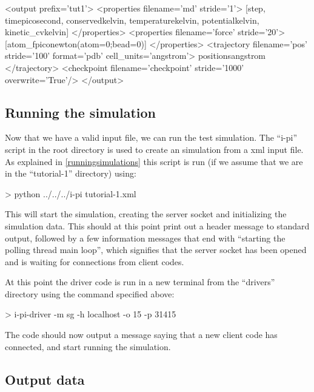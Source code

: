 \documentclass[11pt,english,fleqn]{report}
\newenvironment{code}{%
\footnotesize
\verbatim
}{
\endverbatim
\normalsize
}
\begin{document}
\begin{code}
<output prefix='tut1'>
   <properties filename='md' stride='1'>
      [step, time{picosecond}, conserved{kelvin},
       temperature{kelvin}, potential{kelvin}, kinetic_cv{kelvin}]
   </properties>
   <properties filename='force' stride='20'>
      [atom_f{piconewton}(atom=0;bead=0)]
   </properties>
   <trajectory filename='pos' stride='100' format='pdb' cell_units='angstrom'>
      positions{angstrom}
   </trajectory>
   <checkpoint filename='checkpoint' stride='1000' overwrite='True'/>
</output>
\end{code}

\subsection{Running the simulation}

\label{run1}

Now that we have a valid input file, we can run the test simulation.
The {}``i-pi'' script in the root directory is used to create an
\ipi simulation from a xml input file. As explained in
\ref{runningsimulations} this script is run
(if we assume that we are in the {}``tutorial-1'' directory) using:

\begin{code}
> python ../../../i-pi tutorial-1.xml
\end{code}

This will start the \ipi simulation, creating the server socket and
initializing the simulation data. This should at this point print
out a header message to standard output, followed by a few information
messages that end with {}``starting the polling thread main loop'',
which signifies that the server socket has been opened and is waiting
for connections from client codes.

At this point the driver code is run in a new terminal
from the {}``drivers'' directory using the command
specified above:

\begin{code}
> i-pi-driver -m sg -h localhost -o 15 -p 31415
\end{code}

The \ipi code should now output a message saying that a new client
code has connected, and start running the simulation.

\subsection{Output data}
\end{document}
